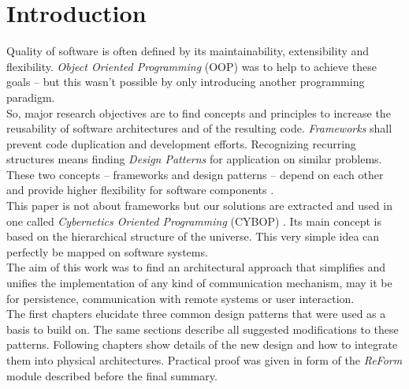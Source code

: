 \section{Introduction}
\label{introduction_section}

Quality of software is often defined by its maintainability, extensibility and
flexibility. \emph{Object Oriented Programming} (OOP) was to help to achieve these goals
-- but this wasn't possible by only introducing another programming paradigm.\\
So, major research objectives are to find concepts and principles to increase the
reusability of software architectures and of the resulting code. \emph{Frameworks}
shall prevent code duplication and development efforts. Recognizing recurring
structures means finding \emph{Design Patterns} for application on similar problems.
These two concepts -- frameworks and design patterns -- depend on each other and
provide higher flexibility for software components \cite{ch:pree}.\\
This paper is not about frameworks but our solutions are extracted and used in one
called \emph{Cybernetics Oriented Programming} (CYBOP) \cite{cybop}. Its main concept
is based on the hierarchical structure of the universe. This very simple idea can
perfectly be mapped on software systems.\\
The aim of this work was to find an architectural approach that simplifies and
unifies the implementation of any kind of communication mechanism, may it be
for persistence, communication with remote systems or user interaction.\\
The first chapters elucidate three common design patterns that were used as a basis
to build on. The same sections describe all suggested modifications to these patterns.
Following chapters show details of the new design and how to integrate them into
physical architectures. Practical proof was given in form of the \emph{ReForm}
module described before the final summary.
